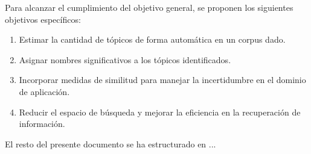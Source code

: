 Para alcanzar el cumplimiento del objetivo general, se proponen los siguientes objetivos específicos:

\begin{enumerate}
	\item Estimar la cantidad de tópicos de forma autom\'atica en un corpus dado.
	
	\item Asignar nombres significativos a los tópicos identificados.
	
	\item Incorporar medidas de similitud para manejar la incertidumbre en el dominio de aplicación.
	
	\item Reducir el espacio de búsqueda y mejorar la eficiencia en la recuperación de información.
\end{enumerate}

El resto del presente documento se ha estructurado en ... 
